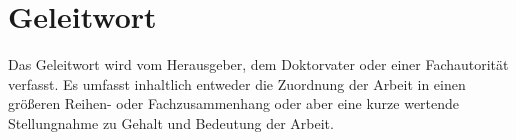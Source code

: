 \section*{Geleitwort}\label{sec:geleitwort}


Das Geleitwort wird vom Herausgeber, dem Doktorvater oder einer Fachautorität verfasst.
Es umfasst inhaltlich entweder die Zuordnung der Arbeit in einen größeren Reihen- oder Fachzusammenhang oder aber eine kurze wertende Stellungnahme zu Gehalt und Bedeutung der Arbeit.

